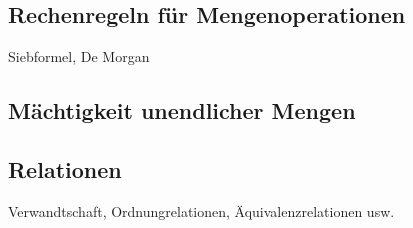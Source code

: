 \documentclass[../../main.tex]{subfiles}
\begin{document}
\subsection*{Rechenregeln für Mengenoperationen}
Siebformel, De Morgan

\subsection*{Mächtigkeit unendlicher Mengen}


\subsection*{Relationen}
\label{relationen}
Verwandtschaft, Ordnungrelationen, Äquivalenzrelationen usw.

\newpage
\pagecolor{white}
\end{document}
